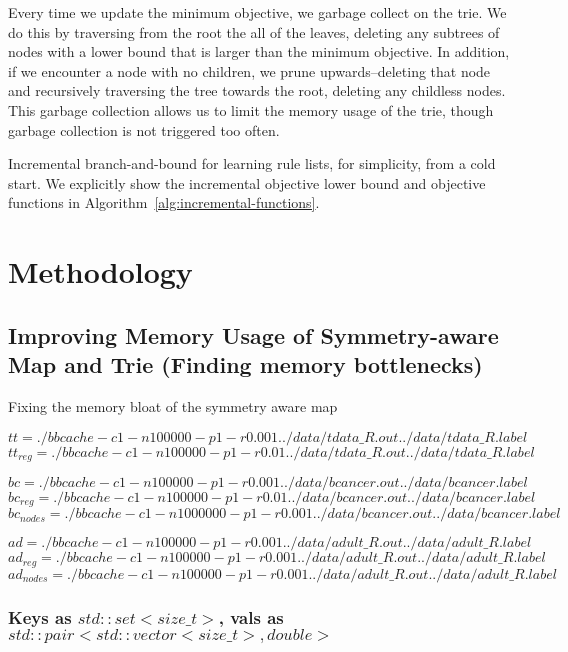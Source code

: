 \documentclass[]{article}
\begin{document}
Every time we update the minimum objective, we garbage collect on the trie. We do this by traversing from the root the all of the leaves, deleting any subtrees of nodes with a lower bound that is larger than the minimum objective. In addition, if we encounter a node with no children, we prune upwards--deleting that node and recursively traversing the tree towards the root, deleting any childless nodes. This garbage collection allows us to limit the memory usage of the trie, though garbage collection is not triggered too often.

\begin{algorithm}[t!]
  \caption{Incremental branch-and-bound for learning rule lists, for simplicity, from a cold start.
  We explicitly show the incremental objective lower bound and objective functions in Algorithm~\ref{alg:incremental-functions}.}
\label{alg:incremental}
\begin{algorithmic}
\normalsize
\end{algorithmic}
\end{algorithm}

\section{Methodology}

\subsection{Improving Memory Usage of Symmetry-aware Map and Trie (Finding memory bottlenecks)}

Fixing the memory bloat of the symmetry aware map

$tt = ./bbcache -c 1 -n 100000 -p 1 -r 0.001 ../data/tdata\_R.out ../data/tdata\_R.label$
$tt_{reg} = ./bbcache -c 1 -n 100000 -p 1 -r 0.01 ../data/tdata\_R.out ../data/tdata\_R.label$

$bc = ./bbcache -c 1 -n 100000 -p 1 -r 0.001 ../data/bcancer.out ../data/bcancer.label$
$bc_{reg} = ./bbcache -c 1 -n 100000 -p 1 -r 0.01 ../data/bcancer.out ../data/bcancer.label$
$bc_{nodes} = ./bbcache -c 1 -n 1000000 -p 1 -r 0.001 ../data/bcancer.out ../data/bcancer.label$

$ad = ./bbcache -c 1 -n 100000 -p 1 -r 0.001 ../data/adult\_R.out ../data/adult\_R.label$
$ad_{reg} = ./bbcache -c 1 -n 100000 -p 1 -r 0.001 ../data/adult\_R.out ../data/adult\_R.label$
$ad_{nodes} = ./bbcache -c 1 -n 100000 -p 1 -r 0.001 ../data/adult\_R.out ../data/adult\_R.label$

\subsubsection{Keys as $std::set<size\_t>$, vals as $std::pair<std::vector<size\_t>, double>$}
\end{document}
